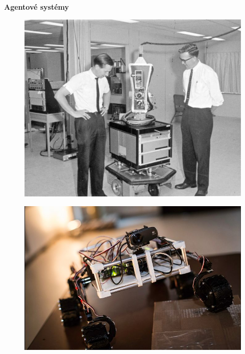 \documentclass[xcolor=dvipsnames]{beamer}
\begin{document}
\begin{frame}{\bf Agentové systémy}
\begin{minipage}{.5\textwidth}
\begin{figure}[!htb]
\centering
\includegraphics[scale=.12]{../pictures/shakey.jpg}
\end{figure}

\begin{figure}[!htb]
\centering
\includegraphics[scale=.25]{../pictures/mars_robot.jpg}
\end{figure}


\end{minipage}


\end{frame}
\end{document}
